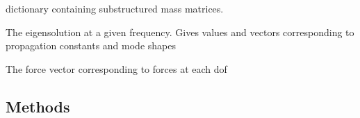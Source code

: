 \documentclass[letterpaper,10pt,english]{sphinxmanual}
\begin{document}

\begin{fulllineitems}
\label{\detokenize{model:pywfe.model.Model.M_sub}}
\pysigstartsignatures
{}
\pysigstopsignatures
\sphinxAtStartPar
dictionary containing substructured mass matrices.

\end{fulllineitems}


\begin{fulllineitems}
\label{\detokenize{model:pywfe.model.Model.eigensolution}}
\pysigstartsignatures
{}
\pysigstopsignatures
\sphinxAtStartPar
The eigensolution at a given frequency. Gives values and vectors corresponding to propagation constants and mode shapes

\end{fulllineitems}


\begin{fulllineitems}
\label{\detokenize{model:pywfe.model.Model.force}}
\pysigstartsignatures
{}
\pysigstopsignatures
\sphinxAtStartPar
The force vector corresponding to forces at each dof

\end{fulllineitems}



\subsection{Methods}
\label{\detokenize{model:methods}}
\end{document}
